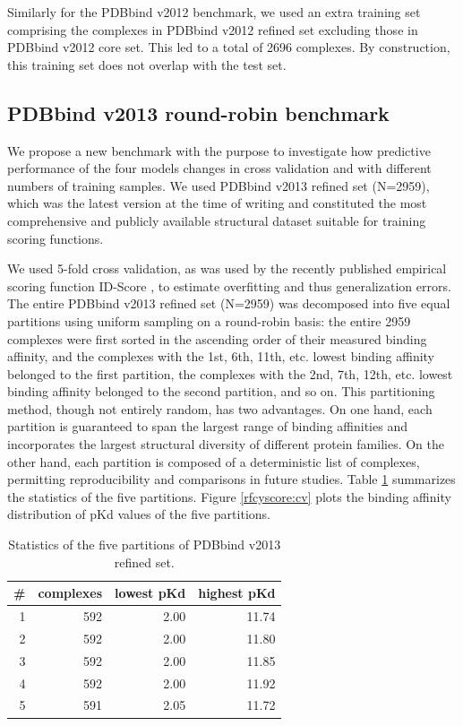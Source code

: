 Similarly for the PDBbind v2012 benchmark, we used an extra training set comprising the complexes in PDBbind v2012 refined set excluding those in PDBbind v2012 core set. This led to a total of 2696 complexes. By construction, this training set does not overlap with the test set.

\subsection{PDBbind v2013 round-robin benchmark}

We propose a new benchmark with the purpose to investigate how predictive performance of the four models changes in cross validation and with different numbers of training samples. We used PDBbind v2013 refined set (N=2959), which was the latest version at the time of writing and constituted the most comprehensive and publicly available structural dataset suitable for training scoring functions.

We used 5-fold cross validation, as was used by the recently published empirical scoring function ID-Score \citep{1305}, to estimate overfitting and thus generalization errors. The entire PDBbind v2013 refined set (N=2959) was decomposed into five equal partitions using uniform sampling on a round-robin basis: the entire 2959 complexes were first sorted in the ascending order of their measured binding affinity, and the complexes with the 1st, 6th, 11th, etc. lowest binding affinity belonged to the first partition, the complexes with the 2nd, 7th, 12th, etc. lowest binding affinity belonged to the second partition, and so on. This partitioning method, though not entirely random, has two advantages. On one hand, each partition is guaranteed to span the largest range of binding affinities and incorporates the largest structural diversity of different protein families. On the other hand, each partition is composed of a deterministic list of complexes, permitting reproducibility and comparisons in future studies. Table \ref{rfcyscore:partitions} summarizes the statistics of the five partitions. Figure \ref{rfcyscore:cv} plots the binding affinity distribution of pKd values of the five partitions.

\begin{table}
\caption{Statistics of the five partitions of PDBbind v2013 refined set.}
\label{rfcyscore:partitions}
\begin{tabular}{rrrr}
\hline
\# & complexes & lowest pKd & highest pKd\\
\hline
1 & 592 & 2.00 & 11.74\\
2 & 592 & 2.00 & 11.80\\
3 & 592 & 2.00 & 11.85\\
4 & 592 & 2.00 & 11.92\\
5 & 591 & 2.05 & 11.72\\
\hline
\end{tabular}
\end{table}

